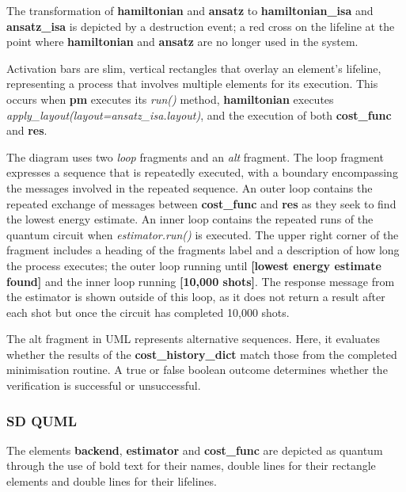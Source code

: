 \documentclass{article}
\begin{document}
The transformation of \textbf{hamiltonian} and \textbf{ansatz} to \textbf{hamiltonian\_isa} and \textbf{ansatz\_isa} is depicted by a destruction event; a red cross on the lifeline at the point where \textbf{hamiltonian} and \textbf{ansatz} are no longer used in the system.

Activation bars are slim, vertical rectangles that overlay an element's lifeline,  representing a process that involves multiple elements for its execution\cite{Seidl_Scholz_Huemer_Kappel_Duffy_2014}. This occurs when \textbf{pm} executes its \textit{run()} method, \textbf{hamiltonian} executes \textit{apply\_layout(layout=ansatz\_isa.layout)}, and the execution of both \textbf{cost\_func} and \textbf{res}.

The diagram uses two \textit{loop} fragments and an \textit{alt} fragment. The loop fragment expresses a sequence that is repeatedly executed, with a boundary encompassing the messages involved in the repeated sequence\cite{Seidl_Scholz_Huemer_Kappel_Duffy_2014}. An outer loop contains the repeated exchange of messages between \textbf{cost\_func} and \textbf{res} as they seek to find the lowest energy estimate. An inner loop contains the repeated runs of the quantum circuit when \textit{estimator.run()} is executed. The upper right corner of the fragment includes a heading of the fragments label and a description of how long the process executes; the outer loop running until \textbf{[lowest energy estimate found]} and the inner loop running \textbf{[10,000 shots]}. The response message from the estimator is shown outside of this loop, as it does not return a result after each shot but once the circuit has completed 10,000 shots. 

The alt fragment in UML represents alternative sequences\cite{Seidl_Scholz_Huemer_Kappel_Duffy_2014}. Here, it evaluates whether the results of the \textbf{cost\_history\_dict} match those from the completed minimisation routine. A true or false boolean outcome determines whether the verification is successful or unsuccessful.

\subsubsection{SD QUML}

The elements \textbf{backend}, \textbf{estimator} and \textbf{cost\_func} are depicted as quantum through the use of bold text for their names, double lines for their rectangle elements and double lines for their lifelines. 
\end{document}
